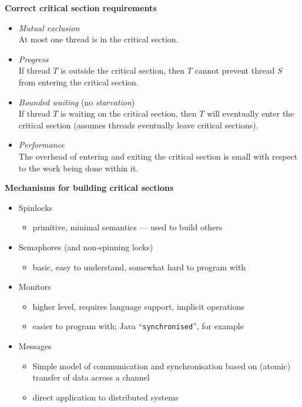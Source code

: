 \documentclass[11pt,a4paper]{article}
\begin{document}
\textbf{Correct critical section requirements}
\begin{itemize}
    \item \emph{Mutual exclusion} \\
        At most one thread is in the critical section.
    \item \emph{Progress} \\
        If thread $T$ is outside the critical section,
        then $T$ cannot prevent thread $S$ from entering the critical section.
    \item \emph{Bounded waiting} (no \emph{starvation}) \\
        If thread $T$ is waiting on the critical section,
        then $T$ will eventually enter the critical section
        (assumes threads eventually leave critical sections).
    \item \emph{Performance} \\
        The overhead of entering and exiting the critical section is small with respect to
        the work being done within it.
\end{itemize}

\textbf{Mechanisms for building critical sections}
\begin{itemize}
    \item Spinlocks
        \begin{itemize}
            \item primitive, minimal semantics --- used to build others
        \end{itemize}
    \item Semaphores (and non-spinning locks)
        \begin{itemize}
            \item basic, easy to understand, somewhat hard to program with
        \end{itemize}
    \item Monitors
        \begin{itemize}
            \item higher level, requires language support, implicit operations
            \item easier to program with; Java ``\texttt{synchronised}'', for example
        \end{itemize}
    \item Messages
        \begin{itemize}
            \item Simple model of communication and synchronisation based on (atomic)
                transfer of data across a channel
            \item direct application to distributed systems
        \end{itemize}
\end{itemize}
\end{document}
